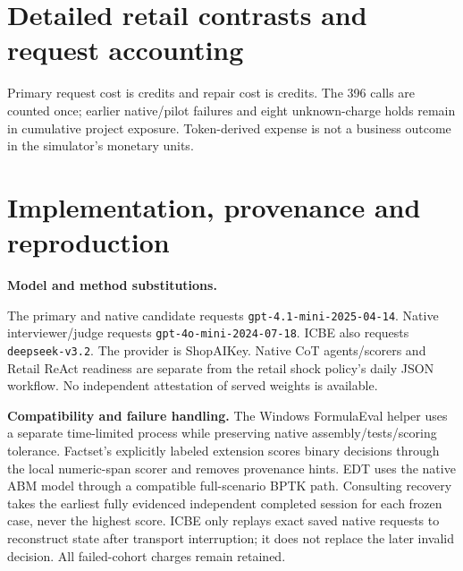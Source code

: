 \documentclass[11pt,a4paper]{article}
\begin{document}
\clearpage
\section{Detailed retail contrasts and request accounting}\label{app:details}
\begin{center}\small
{}\end{center}
\begin{center}\small
{}\end{center}
\begin{center}\footnotesize
{}\end{center}
Primary request cost is \InitialRequestCost{} credits and repair cost is \RepairCost{} credits. The 396 calls are counted once; earlier native/pilot failures and eight unknown-charge holds remain in cumulative project exposure. Token-derived expense is not a business outcome in the simulator's monetary units.

\clearpage
\section{Implementation, provenance and reproduction}
\textbf{Model and method substitutions.}\par
The primary and native candidate requests \texttt{gpt-4.1-mini-2025-04-14}. Native interviewer/judge requests \texttt{gpt-4o-mini-2024-07-18}. ICBE also requests \texttt{deepseek-v3.2}. The provider is ShopAIKey. Native CoT agents/scorers and Retail ReAct readiness are separate from the retail shock policy's daily JSON workflow. No independent attestation of served weights is available.

\textbf{Compatibility and failure handling.} The Windows FormulaEval helper uses a separate time-limited process while preserving native assembly/tests/scoring tolerance. Factset's explicitly labeled extension scores binary decisions through the local numeric-span scorer and removes provenance hints. EDT uses the native ABM model through a compatible full-scenario BPTK path. Consulting recovery takes the earliest fully evidenced independent completed session for each frozen case, never the highest score. ICBE only replays exact saved native requests to reconstruct state after transport interruption; it does not replace the later invalid decision. All failed-cohort charges remain retained.
\end{document}
